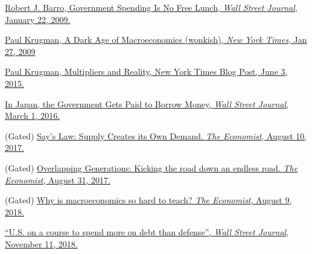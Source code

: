 \documentclass[]{book}
\theoremstyle{definition}
\theoremstyle{definition}
\theoremstyle{definition}
\theoremstyle{remark}
\begin{document}
\href{https://search.proquest.com/docview/399114897/CBD1D9A468D04A85PQ/2?accountid=14512}{Robert
J. Barro, Government Spending Is No Free Lunch, \emph{Wall Street
Journal}, January 22, 2009.}

\href{https://search.proquest.com/docview/1930920374/1A771BC8177A4FB7PQ/1?accountid=14512}{Paul
Krugman, A Dark Age of Macroeconomics (wonkish), \emph{New York Times},
Jan 27, 2009}

\href{https://krugman.blogs.nytimes.com/2015/06/03/multipliers-and-reality/}{Paul
Krugman, Multipliers and Reality, New York Times Blog Post, June 3,
2015.}

\href{https://search.proquest.com/docview/1768757479/E1052F8FA6974859PQ/1?accountid=14512}{In
Japan, the Government Gets Paid to Borrow Money, \emph{Wall Street
Journal}, March 1, 2016.}

(Gated)
\href{https://www.economist.com/economics-brief/2017/08/10/says-law-supply-creates-its-own-demand}{Say's
Law: Supply Creates its Own Demand. \emph{The Economist}, August 10,
2017.}

(Gated)
\href{https://www.economist.com/economics-brief/2017/08/31/kicking-the-can-down-an-endless-road}{Overlapping
Generations: Kicking the road down an endless road. \emph{The
Economist}, August 31, 2017.}

(Gated)
\href{https://www.economist.com/finance-and-economics/2018/08/09/why-is-macroeconomics-so-hard-to-teach}{Why
is macroeconomics so hard to teach? \emph{The Economist}, August 9,
2018.}

\href{https://search.proquest.com/docview/2131663609/B6DB7A44958C4606PQ/1?accountid=14512}{``U.S.
on a course to spend more on debt than defense'', \emph{Wall Street
Journal}, November 11, 2018.}


\end{document}
